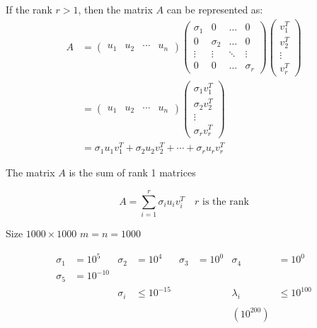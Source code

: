 \documentclass[a4paper, 12pt]{article}
\begin{document}
If the rank \( r > 1 \), then the matrix \( A \) can be represented as:
$$
\begin{aligned}
A &= \begin{pmatrix}
    u_1 & u_2 & \cdots & u_n
    \end{pmatrix}
\begin{pmatrix}
\sigma_1 & 0 & \ldots & 0 \\
0 & \sigma_2 & \ldots & 0 \\
\vdots & \vdots & \ddots & \vdots \\
0 & 0 & \ldots & \sigma_r
\end{pmatrix} \begin{pmatrix}
v_1^T \\
v_2^T \\
\vdots \\
v_r^T
\end{pmatrix} \\
&=
\begin{pmatrix}
u_1 & u_2 & \cdots & u_n
\end{pmatrix}
\begin{pmatrix}
\sigma_1 v_1^T \\
\sigma_2 v_2^T \\
\vdots \\
\sigma_r v_r^T
\end{pmatrix} \\
&=
\sigma_1 u_1 v_1^T + \sigma_2 u_2 v_2^T + \cdots + \sigma_r u_r v_r^T
\end{aligned}
$$

The matrix \( A \) is the sum of rank 1 matrices

\[
A = \sum_{i=1}^{r} \sigma_i u_i v_i^T \quad r \text{ is the rank}
\]

Size \( 1000 \times 1000 \) \quad \( m = n = 1000 \)

\[
\begin{aligned}
\sigma_1 &= 10^5 & \sigma_2 &= 10^4 & \sigma_3 &= 10^0 & \sigma_4 &= 10^0 \\
\sigma_5 &= 10^{-10} & & & & & & \\
& & \sigma_i &\leq 10^{-15} & & & \lambda_i &\leq 10^{100} \\
& & & & & & & \\
& & & & & & \left(10^{200}\right) & \\
\end{aligned}
\]
\end{document}
